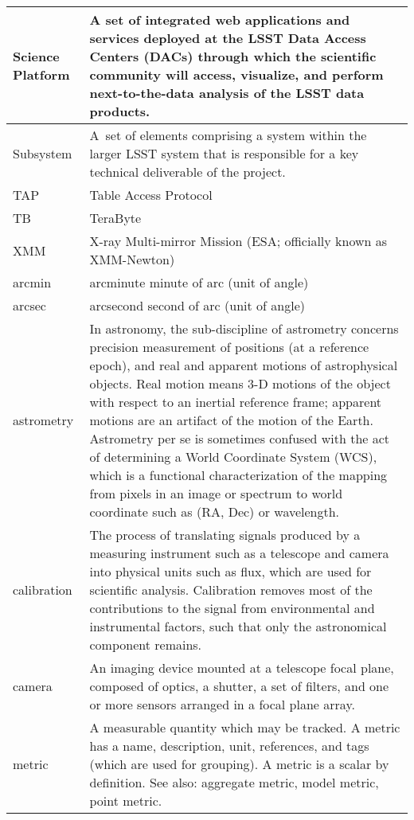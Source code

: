 \begin{longtable}{|l|p{}|}
Science Platform & A set of integrated web applications and services deployed at the LSST Data Access Centers (DACs) through which the scientific community will access, visualize, and perform next-to-the-data analysis of the LSST data products. \\\hline
Subsystem & A set of elements comprising a system within the larger LSST system that is responsible for a key technical deliverable of the project. \\\hline
TAP & Table Access Protocol \\\hline
TB & TeraByte \\\hline
XMM & X-ray Multi-mirror Mission (ESA; officially known as XMM-Newton) \\\hline
arcmin & arcminute minute of arc (unit of angle) \\\hline
arcsec & arcsecond second of arc (unit of angle) \\\hline
astrometry & In astronomy, the sub-discipline of astrometry concerns precision measurement of positions (at a reference epoch), and real and apparent motions of astrophysical objects. Real motion means 3-D motions of the object with respect to an inertial reference frame; apparent motions are an artifact of the motion of the Earth. Astrometry per se is sometimes confused with the act of determining a World Coordinate System (WCS), which is a functional characterization of the mapping from pixels in an image or spectrum to world coordinate such as (RA, Dec) or wavelength. \\\hline
calibration & The process of translating signals produced by a measuring instrument such as a telescope and camera into physical units such as flux, which are used for scientific analysis. Calibration removes most of the contributions to the signal from environmental and instrumental factors, such that only the astronomical component remains. \\\hline
camera & An imaging device mounted at a telescope focal plane, composed of optics, a shutter, a set of filters, and one or more sensors arranged in a focal plane array. \\\hline
metric & A measurable quantity which may be tracked. A metric has a name, description, unit, references, and tags (which are used for grouping). A metric is a scalar by definition. See also: aggregate metric, model metric, point metric. \\\hline
\end{longtable}
